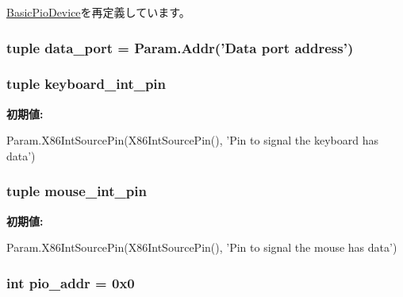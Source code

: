 \hyperlink{classDevice_1_1BasicPioDevice_a17da7064bc5c518791f0c891eff05fda}{BasicPioDevice}を再定義しています。\hypertarget{classI8042_1_1I8042_a9b7aa5f120140d0f44db206487c7961c}{
\subsubsection[{data\_\-port}]{\setlength{\rightskip}{0pt plus 5cm}tuple {\bf data\_\-port} = {\bf Param.Addr}('Data port address')}}
\label{classI8042_1_1I8042_a9b7aa5f120140d0f44db206487c7961c}
\hypertarget{classI8042_1_1I8042_a0e4da7cae6bd43fb05053e39707bdc16}{
\subsubsection[{keyboard\_\-int\_\-pin}]{\setlength{\rightskip}{0pt plus 5cm}tuple {\bf keyboard\_\-int\_\-pin}}}
\label{classI8042_1_1I8042_a0e4da7cae6bd43fb05053e39707bdc16}
{\bfseries 初期値:}
\begin{DoxyCode}
Param.X86IntSourcePin(X86IntSourcePin(),
            'Pin to signal the keyboard has data')
\end{DoxyCode}
\hypertarget{classI8042_1_1I8042_a03f9ac31fac237cf50c3009c7c14a199}{
\subsubsection[{mouse\_\-int\_\-pin}]{\setlength{\rightskip}{0pt plus 5cm}tuple {\bf mouse\_\-int\_\-pin}}}
\label{classI8042_1_1I8042_a03f9ac31fac237cf50c3009c7c14a199}
{\bfseries 初期値:}
\begin{DoxyCode}
Param.X86IntSourcePin(X86IntSourcePin(),
            'Pin to signal the mouse has data')
\end{DoxyCode}
\hypertarget{classI8042_1_1I8042_a659450bdbf05cdba8edf24c47df67671}{
\subsubsection[{pio\_\-addr}]{\setlength{\rightskip}{0pt plus 5cm}int {\bf pio\_\-addr} = 0x0}}
\label{classI8042_1_1I8042_a659450bdbf05cdba8edf24c47df67671}


